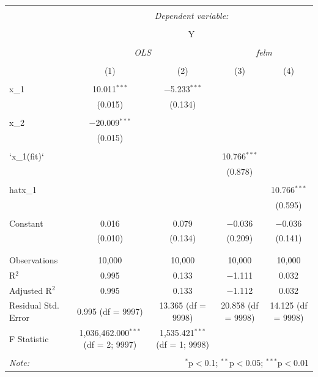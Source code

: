 \documentclass[
]{article}
\begin{document}
\begin{table}[!htbp] \centering 
  \caption{} 
  \label{} 
\begin{tabular}{@{\extracolsep{5pt}}lcccc} 
\\[-1.8ex]\hline 
\hline \\[-1.8ex] 
 & \multicolumn{4}{c}{\textit{Dependent variable:}} \\ 
\cline{2-5} 
\\[-1.8ex] & \multicolumn{4}{c}{Y} \\ 
\\[-1.8ex] & \multicolumn{2}{c}{\textit{OLS}} & \multicolumn{2}{c}{\textit{felm}} \\ 
\\[-1.8ex] & (1) & (2) & (3) & (4)\\ 
\hline \\[-1.8ex] 
 x\_1 & 10.011$^{***}$ & $-$5.233$^{***}$ &  &  \\ 
  & (0.015) & (0.134) &  &  \\ 
  & & & & \\ 
 x\_2 & $-$20.009$^{***}$ &  &  &  \\ 
  & (0.015) &  &  &  \\ 
  & & & & \\ 
 `x\_1(fit)` &  &  & 10.766$^{***}$ &  \\ 
  &  &  & (0.878) &  \\ 
  & & & & \\ 
 hatx\_1 &  &  &  & 10.766$^{***}$ \\ 
  &  &  &  & (0.595) \\ 
  & & & & \\ 
 Constant & 0.016 & 0.079 & $-$0.036 & $-$0.036 \\ 
  & (0.010) & (0.134) & (0.209) & (0.141) \\ 
  & & & & \\ 
\hline \\[-1.8ex] 
Observations & 10,000 & 10,000 & 10,000 & 10,000 \\ 
R$^{2}$ & 0.995 & 0.133 & $-$1.111 & 0.032 \\ 
Adjusted R$^{2}$ & 0.995 & 0.133 & $-$1.112 & 0.032 \\ 
Residual Std. Error & 0.995 (df = 9997) & 13.365 (df = 9998) & 20.858 (df = 9998) & 14.125 (df = 9998) \\ 
F Statistic & 1,036,462.000$^{***}$ (df = 2; 9997) & 1,535.421$^{***}$ (df = 1; 9998) &  &  \\ 
\hline 
\hline \\[-1.8ex] 
\textit{Note:}  & \multicolumn{4}{r}{$^{*}$p$<$0.1; $^{**}$p$<$0.05; $^{***}$p$<$0.01} \\ 
\end{tabular} 
\end{table}
\end{document}
